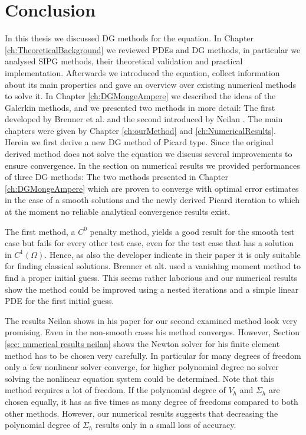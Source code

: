 \section{Conclusion}

In this thesis we discussed DG methods for the \MA equation. In Chapter \ref{ch:TheoreticalBackground} we reviewed PDEs and DG methods, in particular we analysed SIPG methods, their theoretical validation and practical implementation.
Afterwards we introduced the \MA equation, collect information about its main properties and gave an overview over existing numerical methods to solve it. In Chapter \ref{ch:DGMongeAmpere} we described the ideas of the Galerkin methods, and  we presented two methods in more detail: The first developed by Brenner et al. \cite{BGN+2011} and the second introduced by Neilan \cite{Neilan2014}.
The main chapters were given by Chapter \ref{ch:ourMethod} and \ref{ch:NumericalResults}. Herein we first derive a new DG method of Picard type. Since the original derived method does not solve the \MA equation we discuss several improvements to ensure convergence. 
In the section on numerical results we provided performances of three DG methods: The two methods presented in Chapter \ref{ch:DGMongeAmpere} which are proven to converge with optimal error estimates in the case of a smooth solutions and the newly derived Picard iteration to which at the moment no reliable analytical convergence results exist.

The first method, a $C^0$ penalty method, yields a good result for the smooth test case but fails for every other test case, even for the test case that has a solution in $C^1(\Omega)$. Hence, as also the developer indicate in their paper it is only suitable for finding classical solutions.
Brenner et alt. used a vanishing moment method to find a proper initial guess. This seems rather laborious and our numerical results show the method could be improved using a nested iterations and a simple linear PDE for the first initial guess.

The results Neilan shows in his paper for our second examined method look very promising. Even in the non-smooth cases his method converges. However, Section \ref{sec: numerical results neilan} shows the Newton solver for his finite element method has to be chosen very carefully. In particular for many degrees of freedom only a few nonlinear solver converge, for higher polynomial degree no solver solving the nonlinear equation system could be determined.
Note that this method requires a lot of freedom. If the polynomial degree of $V_h$ and $\Sigma_h$ are chosen equally, it has as five times as many degree of freedoms compared to both other methods. However, our numerical results suggests that decreasing the polynomial degree of $\Sigma_h$ results only in a small loss of accuracy.

